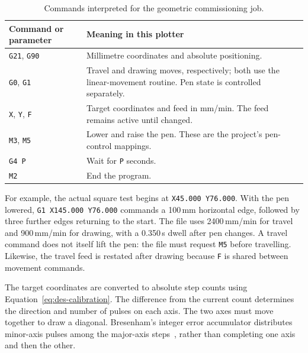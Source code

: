 \begin{table}[!htbp]\centering\small
\begin{tabularx}{\linewidth}{|l|X|}\hline
\textbf{Command or parameter}&\textbf{Meaning in this plotter}\\\hline
\texttt{G21}, \texttt{G90}&Millimetre coordinates and absolute positioning.\\\hline
\texttt{G0}, \texttt{G1}&Travel and drawing moves, respectively; both use the linear-movement routine. Pen state is controlled separately.\\\hline
\texttt{X}, \texttt{Y}, \texttt{F}&Target coordinates and feed in mm/min. The feed remains active until changed.\\\hline
\texttt{M3}, \texttt{M5}&Lower and raise the pen. These are the project's pen-control mappings.\\\hline
\texttt{G4 P}&Wait for \texttt{P} seconds.\\\hline
\texttt{M2}&End the program.\\\hline
\end{tabularx}
\caption{Commands interpreted for the geometric commissioning job.}
\label{tab:des-gcode-commands}
\end{table}

For example, the actual square test begins at \texttt{X45.000 Y76.000}. With the pen lowered, \texttt{G1 X145.000 Y76.000} commands a 100\,mm horizontal edge, followed by three further edges returning to the start. The file uses 2400\,mm/min for travel and 900\,mm/min for drawing, with a 0.350\,s dwell after pen changes. A travel command does not itself lift the pen: the file must request \texttt{M5} before travelling. Likewise, the travel feed is restated after drawing because \texttt{F} is shared between movement commands.

The target coordinates are converted to absolute step counts using Equation~\ref{eq:des-calibration}. The difference from the current count determines the direction and number of pulses on each axis. The two axes must move together to draw a diagonal. Bresenham's integer error accumulator distributes minor-axis pulses among the major-axis steps~\cite[p.~28]{bresenham1965}, rather than completing one axis and then the other.

